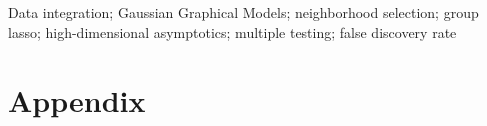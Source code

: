 \documentclass[twoside,11pt]{article}
\numberwithin{equation}{section}
\begin{document}
\vspace{1em}
\begin{keywords}
Data integration; Gaussian Graphical Models; neighborhood selection; group lasso; high-dimensional asymptotics; multiple testing; false discovery rate
\end{keywords}
\newpage

%






\newpage
\vskip 0.1in


\newpage
\appendix
\section*{Appendix}



\end{document}
